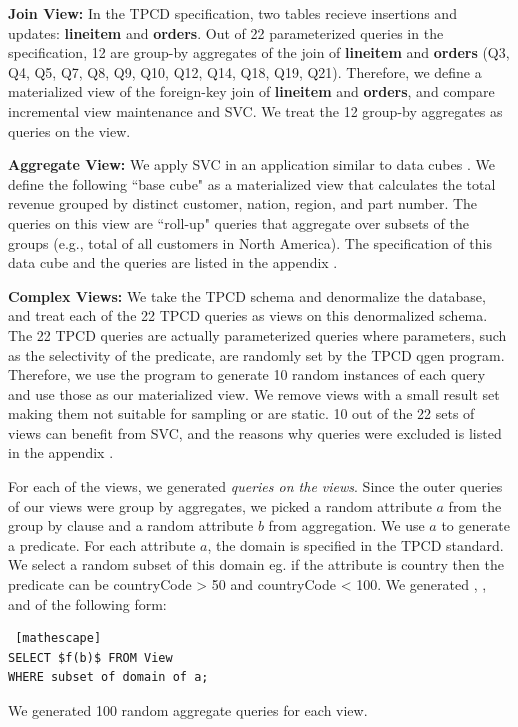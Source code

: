 \textbf{Join View: } In the TPCD specification, two tables recieve insertions and updates: \textbf{lineitem} and \textbf{orders}.
Out of 22 parameterized queries in the specification, 12 are group-by aggregates of the join of \textbf{lineitem} and \textbf{orders} (Q3, Q4, Q5, Q7, Q8, Q9, Q10, Q12, Q14, Q18, Q19, Q21).
Therefore, we define a materialized view of the foreign-key join of \textbf{lineitem} and \textbf{orders}, and compare incremental view maintenance and SVC.
We treat the 12 group-by aggregates as queries on the view.

\textbf{Aggregate View: } We apply SVC in an application similar to data cubes \cite{gray1997data}.
We define the following ``base cube" as a materialized view that calculates the total revenue 
grouped by distinct customer, nation, region, and part number.
The queries on this view are ``roll-up" queries that aggregate over 
subsets of the groups (e.g., total of all customers in North America).
The specification of this data cube and the queries are listed in the appendix .

\textbf{Complex Views:} We take the TPCD schema and denormalize the database, and treat each of the 22 
TPCD queries as views on this denormalized schema. 
The 22 TPCD queries are actually parameterized queries where parameters, such as the selectivity of the predicate, are randomly set by the TPCD \textsf{qgen} program.
Therefore, we use the program to generate 10 random instances of each query and use those as our materialized view.
We remove views with a small result set making them not suitable for sampling or are static.
10 out of the 22 sets of views can benefit from SVC, and the reasons why queries were excluded is listed in the appendix .

For each of the views, we generated \emph{queries on the views}.
Since the outer queries of our views were group by aggregates, we picked a random attribute $a$ from the group by clause and a random attribute $b$ from aggregation.
We use $a$ to generate a predicate.
For each attribute $a$, the domain is specified in the TPCD standard.
We select a random subset of this domain eg. if the attribute is country then the predicate can be \textsf{countryCode} > 50 and \textsf{countryCode} < 100.
We generated \sumfunc, \avgfunc, and \countfunc of the following form: 
\begin{lstlisting} [mathescape]
SELECT $f(b)$ FROM View 
WHERE subset of domain of a;
\end{lstlisting}
We generated 100 random aggregate queries for each view.

